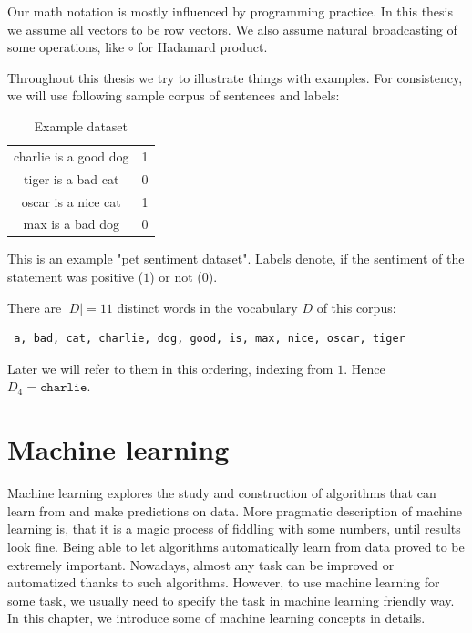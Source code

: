     Our math notation is mostly influenced by programming practice.
    In this thesis we assume all vectors to be row vectors.
    We also assume natural broadcasting of some operations, like $\circ$ for Hadamard product.
    
    Throughout this thesis we try to illustrate things with examples. 
    For consistency, we will use following sample corpus of sentences and labels:
    
    \begin{table}[h]
        \centering
        \begin{tabular}{c|c}
        \hline
            charlie is a good dog & 1 \\
            tiger is a bad cat & 0 \\
            oscar is a nice cat & 1 \\
            max is a bad dog & 0 \\
        \end{tabular}
        \caption{Example dataset}
        \label{tab:example:dataset}

    \end{table}
    
    This is an example "pet sentiment dataset". Labels denote, if the sentiment of the statement was positive ($1$) or not ($0$). 

    There are $|D|=11$ distinct words in the vocabulary $D$ of this corpus: 
    \begin{verbatim} a, bad, cat, charlie, dog, good, is, max, nice, oscar, tiger \end{verbatim}
    
    Later we will refer to them in this ordering, indexing from $1$. 
    Hence $D_4=\mathtt{charlie}$.


\section{Machine learning}
    
    Machine learning explores the study and construction of algorithms that can learn from and make predictions on data.
    More pragmatic description of machine learning is, that it is a magic process of fiddling with some numbers, until results look fine. \*%
    Being able to let algorithms automatically learn from data proved to be extremely important.
    Nowadays, almost any task can be improved or automatized thanks to such algorithms. 
    However, to use machine learning for some task, we usually need to specify the task in machine learning friendly way.    
    In this chapter, we introduce some of machine learning concepts in details.


